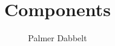 \documentclass{article}
\author{Palmer Dabbelt}
\title{Components}
\begin{document}
\maketitle
\tableofcontents
\contentsskip


\end{document}
